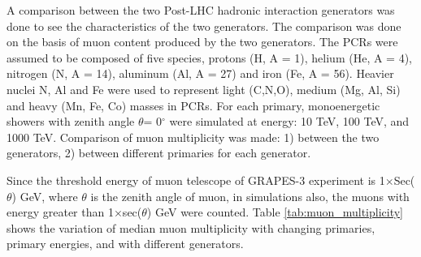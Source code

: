 \documentclass[12pt]{article}
\begin{document}
A comparison between the two Post-LHC hadronic interaction generators was done
to see the characteristics of the two generators. The comparison was done on
the basis of muon content produced by the two generators. The PCRs were assumed
to be composed of five species, protons (H, A = 1), helium (He, A = 4),
nitrogen (N, A = 14), aluminum (Al, A = 27) and iron (Fe, A = 56). Heavier
nuclei N, Al and Fe were used to represent light (C,N,O), medium (Mg, Al, Si)
and heavy (Mn, Fe, Co) masses in PCRs. For each primary, monoenergetic showers
with zenith angle $\theta$= 0$^{\circ}$ were simulated at energy: 10 TeV, 100
TeV, and 1000 TeV. Comparison of muon multiplicity was made: 1) between the
two generators, 2) between different primaries for each generator.

Since the threshold energy of muon telescope of GRAPES-3 experiment is
1$\times$Sec($\theta$) GeV, where $\theta$ is the zenith angle of muon, in
simulations also, the muons with energy greater than 1$\times$sec($\theta$) GeV
were counted. Table \ref{tab:muon_multiplicity} shows the variation of median
muon multiplicity with changing primaries, primary energies, and with different
generators. 
\end{document}
